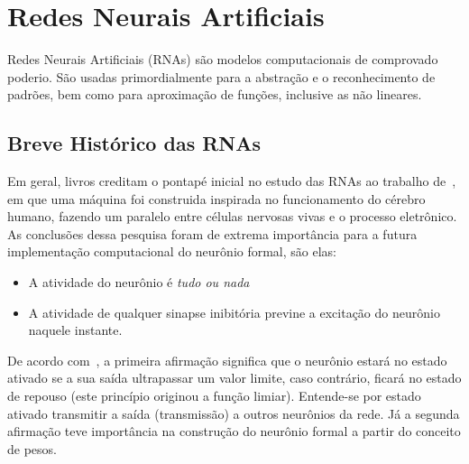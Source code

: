 \chapter{Redes Neurais Artificiais}
\label{Cap:RedesNeurais}

Redes Neurais Artificiais (RNAs) são modelos computacionais de comprovado poderio. São usadas primordialmente para a abstração e o reconhecimento de padrões, bem como para aproximação de funções, inclusive as não lineares.

\section{Breve Histórico das RNAs}

Em geral, livros creditam o pontapé inicial no estudo das RNAs ao trabalho de~\cite{McCulloch1943}, em que uma máquina foi construida inspirada no funcionamento do cérebro humano, fazendo um paralelo entre células nervosas vivas e o processo eletrônico. As conclusões dessa pesquisa foram de extrema importância para a futura implementação computacional do neurônio formal, são elas:
\begin{itemize}
	\item A atividade do neurônio é \emph{tudo ou nada}
	\item A atividade de qualquer sinapse inibitória previne a excitação do neurônio naquele instante.
\end{itemize}

De acordo com~\cite{Cardon1994}, a primeira afirmação significa que o neurônio estará no estado ativado se a sua saída ultrapassar um valor limite, caso contrário, ficará no estado de repouso (este princípio originou a função limiar). Entende-se por estado ativado transmitir a saída (transmissão) a outros neurônios da rede. Já a segunda afirmação teve importância na construção do neurônio formal a partir do conceito de pesos.

